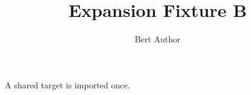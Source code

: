 \title{Expansion Fixture B}\author{Bert Author}
\begin{lemma}\label{main}A shared target is imported once.\end{lemma}
\cite{a}\cite{c}

